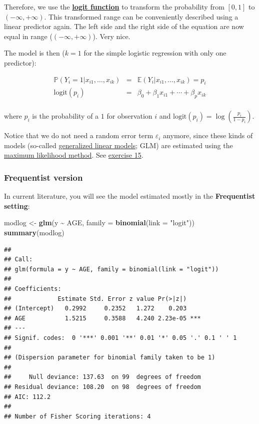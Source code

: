 \documentclass[
]{book}
\newenvironment{Shaded}{\begin{snugshade}}{\end{snugshade}}
\newcommand{\AttributeTok}[1]{\textcolor[rgb]{0.13,0.29,0.53}{#1}}
\newcommand{\FunctionTok}[1]{\textcolor[rgb]{0.13,0.29,0.53}{\textbf{#1}}}
\newcommand{\NormalTok}[1]{#1}
\newcommand{\OtherTok}[1]{\textcolor[rgb]{0.56,0.35,0.01}{#1}}
\newcommand{\SpecialCharTok}[1]{\textcolor[rgb]{0.81,0.36,0.00}{\textbf{#1}}}
\newcommand{\StringTok}[1]{\textcolor[rgb]{0.31,0.60,0.02}{#1}}
\begin{document}
Therefore, we use the \href{https://en.wikipedia.org/wiki/Logit}{\textbf{logit function}} to transform
the probability from \([0,1]\) to \((-\infty, +\infty)\).
This transformed range can be conveniently described using a linear predictor again.
The left side and the right side of the equation are now equal in range (\((-\infty, +\infty)\)).
Very nice.

The model is then (\(k=1\) for the simple logistic regression with only one predictor):

\[
\begin{array}{rcl}
\mathbb{P}(Y_i = 1 | x_{i1}, \ldots, x_{ik}) &=& \mathbb{E}(Y_i | x_{i1}, \ldots, x_{ik}) = p_i \\
\text{logit}(p_i) &=& \beta_0 + \beta_1 x_{i1} + \cdots + \beta_p x_{ik} \\
\end{array}
\]

where \(p_i\) is the probability of a \(1\) for observation \(i\)
and \(\text{logit}(p_i) = \log\left(\frac{p_i}{1 - p_i}\right)\).

Notice that we do not need a random error term \(\varepsilon_i\) anymore,
since these kinds of models
(so-called \href{https://en.wikipedia.org/wiki/Generalized_linear_model}{generalized linear models}; GLM)
are estimated using the \href{https://en.wikipedia.org/wiki/Maximum_likelihood_estimation}{maximum likelihood method}.
See \hyperref[exercise15_LMM]{exercise 15}.

\subsubsection{Frequentist version}\label{frequentist_logistic}

In current literature, you will see the model estimated mostly in the \textbf{Frequentist setting}:

\begin{Shaded}
\begin{Highlighting}[]
\NormalTok{modlog }\OtherTok{\textless{}{-}} \FunctionTok{glm}\NormalTok{(y }\SpecialCharTok{\textasciitilde{}}\NormalTok{ AGE, }\AttributeTok{family =} \FunctionTok{binomial}\NormalTok{(}\AttributeTok{link =} \StringTok{"logit"}\NormalTok{))}
\FunctionTok{summary}\NormalTok{(modlog)}
\end{Highlighting}
\end{Shaded}

\begin{verbatim}
## 
## Call:
## glm(formula = y ~ AGE, family = binomial(link = "logit"))
## 
## Coefficients:
##             Estimate Std. Error z value Pr(>|z|)    
## (Intercept)   0.2992     0.2352   1.272    0.203    
## AGE           1.5215     0.3588   4.240 2.23e-05 ***
## ---
## Signif. codes:  0 '***' 0.001 '**' 0.01 '*' 0.05 '.' 0.1 ' ' 1
## 
## (Dispersion parameter for binomial family taken to be 1)
## 
##     Null deviance: 137.63  on 99  degrees of freedom
## Residual deviance: 108.20  on 98  degrees of freedom
## AIC: 112.2
## 
## Number of Fisher Scoring iterations: 4
\end{verbatim}
\end{document}
